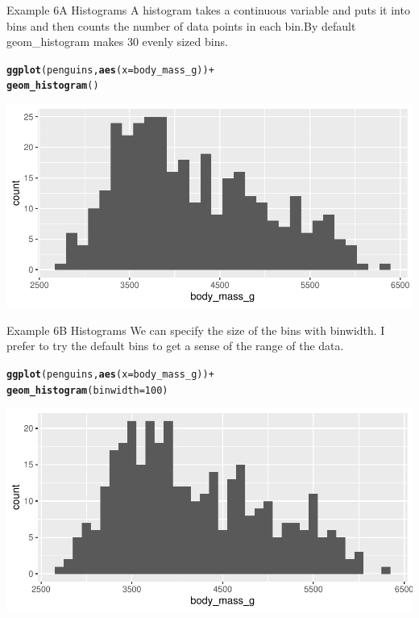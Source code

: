 \documentclass{beamer}\usepackage[]{graphicx}\usepackage[]{color}
\makeatletter
\newcommand{\hlnum}[1]{\textcolor[rgb]{0.686,0.059,0.569}{#1}}%
\newcommand{\hlopt}[1]{\textcolor[rgb]{0,0,0}{#1}}%
\newcommand{\hlstd}[1]{\textcolor[rgb]{0.345,0.345,0.345}{#1}}%
\newcommand{\hlkwc}[1]{\textcolor[rgb]{0.333,0.667,0.333}{#1}}%
\newcommand{\hlkwd}[1]{\textcolor[rgb]{0.737,0.353,0.396}{\textbf{#1}}}%
\newenvironment{kframe}{%
 \def\at@end@of@kframe{}%
 \ifinner\ifhmode%
  \def\at@end@of@kframe{\end{minipage}}%
  \begin{minipage}{\columnwidth}%
 \fi\fi%
 \def\FrameCommand##1{\hskip\@totalleftmargin \hskip-\fboxsep
 \colorbox{shadecolor}{##1}\hskip-\fboxsep
     \hskip-\linewidth \hskip-\@totalleftmargin \hskip\columnwidth}%
 \MakeFramed {\advance\hsize-\width
   \@totalleftmargin\z@ \linewidth\hsize
   \@setminipage}}%
 {\par\unskip\endMakeFramed%
 \at@end@of@kframe}
\newenvironment{knitrout}{}{} %
\makeatother
\begin{document}
\begin{frame}[fragile]{Example 6A Histograms}
A histogram takes a continuous variable and puts it into bins and then counts the number of data points in each bin.By default geom\_histogram makes 30 evenly sized bins.
\begin{knitrout}
\color{fgcolor}\begin{kframe}
\begin{alltt}
\hlkwd{ggplot}\hlstd{(penguins,} \hlkwd{aes}\hlstd{(}\hlkwc{x} \hlstd{= body_mass_g))} \hlopt{+}
    \hlkwd{geom_histogram}\hlstd{()}
\end{alltt}
\end{kframe}
\includegraphics[width=0.95\linewidth]{figure/unnamed-chunk-21-1} 
\end{knitrout}


\end{frame}

\begin{frame}[fragile]{Example 6B Histograms}
We can specify the size of the bins with binwidth. I prefer to try the default bins to get a sense of the range of the data.
\begin{knitrout}
\color{fgcolor}\begin{kframe}
\begin{alltt}
\hlkwd{ggplot}\hlstd{(penguins,} \hlkwd{aes}\hlstd{(}\hlkwc{x} \hlstd{= body_mass_g))} \hlopt{+}
    \hlkwd{geom_histogram}\hlstd{(}\hlkwc{binwidth} \hlstd{=} \hlnum{100}\hlstd{)}
\end{alltt}
\end{kframe}
\includegraphics[width=0.95\linewidth]{figure/unnamed-chunk-22-1} 
\end{knitrout}


\end{frame}
\end{document}
